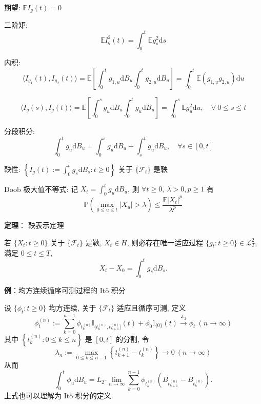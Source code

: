 \documentclass[openany]{ctexbook}
\theoremstyle{kaiti}
\theoremstyle{normal}
\begin{document}
期望: $\mathbb{E}I_g(t)=0$

二阶矩:
\begin{equation}
  \mathbb{E}I_g^2(t)=\int_0^t\mathbb{E}g_s^2\mathrm{d}s
\end{equation}

内积:
\begin{equation}
  \langle I_{g_1}(t),I_{g_2}(t)\rangle=\mathbb{E}\left[\int_0^tg_{1,u}\mathrm{d}B_u\int_0^tg_{2,u}\mathrm{d}B_u\right]=\int_0^t \mathbb{E}(g_{1,u}g_{2,u})\mathrm{d}u
\end{equation}

\begin{equation}
  \langle I_{g}(s),I_{g}(t)\rangle=\mathbb{E}\left[\int_0^sg_{u}\mathrm{d}B_u\int_0^tg_{u}\mathrm{d}B_u\right]=\int_0^s \mathbb{E}g_u^2\mathrm{d}u,\quad\forall~0\leqslant s\leqslant t
\end{equation}

分段积分:
\begin{equation}
  \int_0^tg_u\mathrm{d}B_u=\int_0^sg_u\mathrm{d}B_u+\int_s^tg_u\mathrm{d}B_u,\quad\forall s\in[0,t]
\end{equation}

鞅性: $\displaystyle\left\{I_g(t):=\int_0^tg_s\mathrm{d}B_s:t\geqslant0\right\}$ 关于 $\{\mathcal{F}_t\}$ 是鞅

Doob 极大值不等式: 记 $\displaystyle X_t=\int_0^tg_u\mathrm{d}B_u$, 则 $\forall t\geqslant0,~\lambda>0,p\geqslant1$ 有
\begin{equation}
  \mathbb{P}\left(\max_{0\leqslant u\leqslant t}|X_u|>\lambda\right)\leqslant\frac{\mathbb{E}|X_t|^p}{\lambda^p}
\end{equation}

\textbf{定理}： 鞅表示定理

若 $\{X_t:t\geqslant0\}$ 关于 $\{\mathcal{F}_t\}$ 是鞅, $X_t\in H$, 则必存在唯一适应过程 $\{g_t:t\geqslant0\}\in\mathcal{L}_T^2$, 满足 $0\leqslant t\leqslant T$,
\begin{equation}
  X_t-X_0=\int_0^tg_s\mathrm{d}B_s.
\end{equation}

\textbf{例}：均方连续循序可测过程的 It\"o 积分

设 $\{\phi_t:t\geqslant0\}$ 均方连续, 关于 $\{\mathcal{F}_t\}$ 适应且循序可测, 定义
\begin{equation}
  \phi_t^{(n)}:=\sum_{k=0}^{n-1}\phi_{t_k^{(n)}}\mathbb{I}_{(t_k^{(n)},t_{k+1}^{(n)}]}(t)+\phi_0\mathbb{I}_{\{0\}}(t)\overset{\mathrm{\mathcal{L}_2}}{\to}\phi_t~(n\to\infty)
\end{equation}
其中 $\left\{t_k^{(n)}:0\leqslant k\leqslant n\right\}$ 是 $[0,t]$ 的分割, 令
\begin{equation}
  \lambda_n:=\max_{0\leqslant k\leqslant n-1}\left\{t_{k+1}^{(n)}-t_{k}^{(n)}\right\}\to0~(n\to\infty)
\end{equation}
从而
\begin{equation}
  \int_0^t\phi_u\mathrm{d}B_u=L_2\text{-}\lim_{n\to\infty}\sum_{k=0}^{n-1}\phi_{t_k^{(n)}}\left(B_{t_{k+1}^{(n)}}-B_{t_{k}^{(n)}}\right).
\end{equation}
上式也可以理解为 It\"o 积分的定义.
\end{document}
